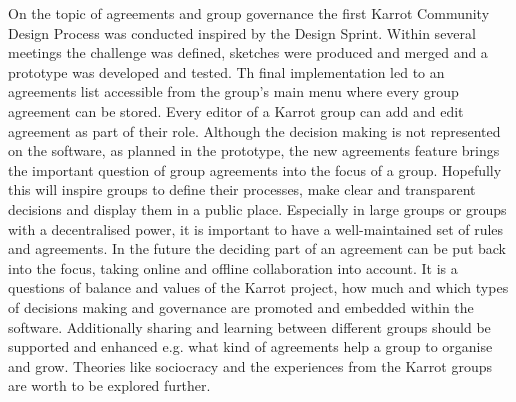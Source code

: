 \documentclass[
	a4paper,%
	11pt,%
	]{article}
\begin{document}
On the topic of agreements and group governance the first Karrot Community Design Process was conducted inspired by the Design Sprint. Within several meetings the challenge was defined, sketches were produced and merged and a prototype was developed and tested. Th final implementation led to an agreements list accessible from the group's main menu where every group agreement can be stored. Every editor of a Karrot group can add and edit agreement as part of their role.
Although the decision making is not represented on the software, as planned in the prototype, the new agreements feature brings the important question of group agreements into the focus of a group. Hopefully this will inspire groups to define their processes, make clear and transparent decisions and display them in a public place. Especially in large groups or groups with a decentralised power, it is important to have a well-maintained set of rules and agreements.
In the future the deciding part of an agreement can be put back into the focus, taking online and offline collaboration into account. It is a questions of balance and values of the Karrot project, how much and which types of decisions making and governance are promoted and embedded within the software. Additionally sharing and learning between different groups should be supported and enhanced e.g. what kind of agreements help a group to organise and grow. Theories like sociocracy and the experiences from the Karrot groups are worth to be explored further.
\end{document}
